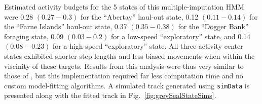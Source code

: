 \documentclass[12pt]{article}\usepackage[]{graphicx}\usepackage[]{color}
\begin{document}
Estimated activity budgets for the 5 states of this multiple-imputation HMM were 0.28 $(0.27-0.3)$ for the ``Abertay'' haul-out state, 0.12 $(0.11-0.14)$ for the ``Farne Islands'' haul-out state, 0.37 $(0.35-0.38)$ for the ``Dogger Bank'' foraging state, 0.09 $(0.03-0.2)$ for a low-speed ``exploratory'' state, and 0.14 $(0.08-0.23)$ for a high-speed ``exploratory'' state. All three activity center states exhibited shorter step lengths and less biased movements when within the viscinity of these targets. Results from this analysis were thus very similar to those of \cite{McClintockEtAl2012}, but this implementation required far less computation time and no custom model-fitting algorithms. A simulated track generated using \verb|simData| is presented along with the fitted track in Fig.\ \ref{fig:greySealStateSims}.%
\end{document}
